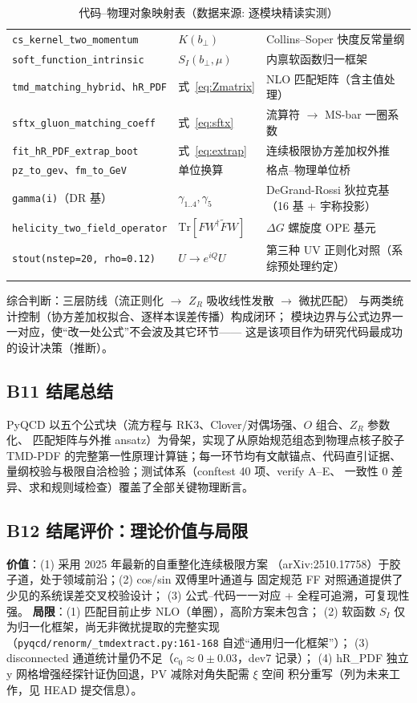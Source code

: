 \documentclass[UTF8]{ctexart}
\begin{document}
\begin{xltabular}{\textwidth}{Xll}
\texttt{\nolinkurl{cs_kernel_two_momentum}} & $K(b_\perp)$ & Collins--Soper 快度反常量纲 \\
\texttt{\nolinkurl{soft_function_intrinsic}} & $S_I(b_\perp,\mu)$ & 内禀软函数归一框架 \\
\texttt{\nolinkurl{tmd_matching_hybrid}}、\texttt{\nolinkurl{hR_PDF}} & 式~\eqref{eq:Zmatrix} & NLO 匹配矩阵（含主值处理） \\
\texttt{\nolinkurl{sftx_gluon_matching_coeff}} & 式~\eqref{eq:sftx} & 流算符 $\to$ MS-bar 一圈系数 \\
\texttt{\nolinkurl{fit_hR_PDF_extrap_boot}} & 式~\eqref{eq:extrap} & 连续极限协方差加权外推 \\
\texttt{\nolinkurl{pz_to_gev}}、\texttt{\nolinkurl{fm_to_GeV}} & 单位换算 & 格点--物理单位桥 \\
\texttt{\nolinkurl{gamma(i)}}（DR 基） & $\gamma_{1..4},\gamma_5$ & DeGrand-Rossi 狄拉克基（16 基 + 宇称投影） \\
\texttt{\nolinkurl{helicity_two_field_operator}} & $\mathrm{Tr}[FW^\dagger\tilde FW]$ & $\Delta G$ 螺旋度 OPE 基元 \\
\texttt{\nolinkurl{stout(nstep=20, rho=0.12)}} & $U\to e^{iQ}U$ & 第三种 UV 正则化对照（系综预处理约定） \\
\bottomrule
\caption{代码--物理对象映射表（数据来源: 逐模块精读实测）}
\end{xltabular}

综合判断：三层防线（流正则化 $\to$ $Z_R$ 吸收线性发散 $\to$ 微扰匹配）
与两类统计控制（协方差加权拟合、逐样本误差传播）构成闭环；
模块边界与公式边界一一对应，使``改一处公式''不会波及其它环节——
这是该项目作为研究代码最成功的设计决策（推断）。

\subsection{B11 结尾总结}
\begin{conclbox}
PyQCD 以五个公式块（流方程与 RK3、Clover/对偶场强、$O$ 组合、$Z_R$ 参数化、
匹配矩阵与外推 ansatz）为骨架，实现了从原始规范组态到物理点核子胶子
TMD-PDF 的完整第一性原理计算链；每一环节均有文献锚点、代码直引证据、
量纲校验与极限自洽检验；测试体系（conftest 40 项、verify A--E、
一致性 0 差异、求和规则域检查）覆盖了全部关键物理断言。
\end{conclbox}

\subsection{B12 结尾评价：理论价值与局限}
\textbf{价值}：(1) 采用 2025 年最新的自重整化连续极限方案
（arXiv:2510.17758）于胶子道，处于领域前沿；(2) cos/sin 双傅里叶通道与
固定规范 FF 对照通道提供了少见的系统误差交叉校验设计；
(3) 公式--代码一一对应 + 全程可追溯，可复现性强。
\textbf{局限}：(1) 匹配目前止步 NLO（单圈），高阶方案未包含；
(2) 软函数 $S_I$ 仅为归一化框架，尚无非微扰提取的完整实现
（\texttt{\nolinkurl{pyqcd/renorm/_tmdextract.py:161-168}} 自述``通用归一化框架''）；
(3) disconnected 通道统计量仍不足（$c_0\approx0\pm0.03$，dev7 记录）；
(4) hR\_PDF 独立 y 网格增强经探针证伪回退，PV 减除对角失配需 $\xi$ 空间
积分重写（列为未来工作，见 HEAD 提交信息）。
\end{document}
